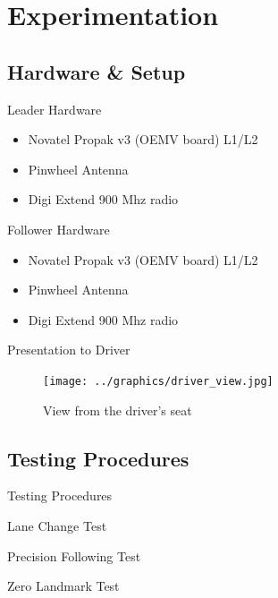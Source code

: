 \documentclass{beamer}
\begin{document}
\section{Experimentation}

  \subsection{Hardware \& Setup}

    \begin{frame}{Leader Hardware}
      \begin{itemize}
        \item Novatel Propak v3 (OEMV board) L1/L2
        \item Pinwheel Antenna
        \item Digi Extend 900 Mhz radio
      \end{itemize}
    \end{frame}

    \begin{frame}{Follower Hardware}
      \begin{itemize}
        \item Novatel Propak v3 (OEMV board) L1/L2
        \item Pinwheel Antenna
        \item Digi Extend 900 Mhz radio
      \end{itemize}
    \end{frame}

    \begin{frame}{Presentation to Driver}
      \begin{figure}[ht] \centering
        \texttt{[image: ../graphics/driver\_view.jpg]}
        \caption{View from the driver's seat} \label{fig:driver_view}
      \end{figure}
    \end{frame}


  \subsection{Testing Procedures}

    \begin{frame}{Testing Procedures}
    
      Lane Change Test

      Precision Following Test
      
      Zero Landmark Test

    \end{frame}
\end{document}

